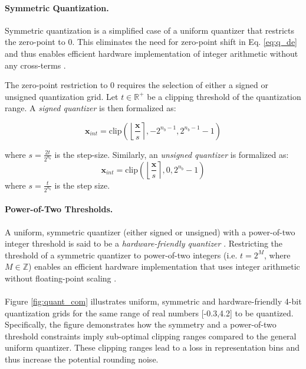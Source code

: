 \documentclass{article}
\newcommand{\round}[1]{\left\lfloor#1\right\rceil}
\newcommand{\matsym}[1]{\mathbf{#1}}
\newcommand{\clip}[3]{\mathrm{clip}\left(#1,#2,#3\right)}
\begin{document}
\paragraph{Symmetric Quantization.} 

Symmetric quantization is a simplified case of a uniform quantizer that restricts the zero-point to $0$. This eliminates the need for zero-point shift in Eq. \ref{eq:q_de} and thus enables efficient hardware implementation of integer arithmetic without any cross-terms \nolinebreak \cite{jain2019trained}.

The zero-point restriction to 0 requires the selection of either a signed or unsigned quantization grid. Let $t \in \mathbb{R^{+}}$ be a clipping threshold of the quantization range. 
A \textit{signed quantizer} is then formalized as: 

\begin{equation}
\label{equ:signed_quantizer}
\matsym{x}_{int}=\clip{\round{\frac{\matsym{x}}{s}}}{-2^{n_b-1}}{2^{n_b-1}-1}
\end{equation}

where $s = \frac{2t}{2^{n_b}}$ is the step-size. Similarly, an \textit{unsigned quantizer} is formalized as: 
\begin{equation}
\label{equ:unsigned_quantizer}
\matsym{x}_{int}=\clip{\round{\frac{\matsym{x}}{s}}}{0}{2^{n_b}-1}
\end{equation}
where $s =\frac{t}{2^{n_b}}$ is the step size. 



\paragraph{Power-of-Two Thresholds.}
A uniform, symmetric quantizer (either signed or unsigned) with a power-of-two integer threshold is said to be a \textit{hardware-friendly quantizer} \cite{hmq}. Restricting the threshold of a symmetric quantizer to power-of-two integers (i.e. $t=2^M$, where $M \in \mathbb{Z}$) enables an efficient hardware implementation that uses integer arithmetic without floating-point scaling \cite{jain2019trained}.






\paragraph{}
Figure \ref{fig:quant_com} illustrates uniform, symmetric and hardware-friendly 4-bit quantization grids for the same range of real numbers [-0.3,4.2] to be quantized. 
Specifically, the figure demonstrates how the symmetry and a power-of-two threshold constraints imply sub-optimal clipping ranges compared to the general uniform quantizer.
These clipping ranges lead to a loss in representation bins and thus increase the potential rounding noise.
\end{document}

